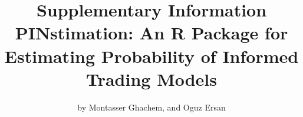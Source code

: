 

\title{Supplementary Information \protect\\ \Large PINstimation: An R Package for Estimating Probability of Informed Trading Models}
\author{by Montasser Ghachem, and Oguz Ersan}
\maketitle

\listoftables
\listoffigures




\setcounter{table}{0}
\renewcommand{\thetable}{S\arabic{table}}

\setcounter{figure}{0}
\renewcommand{\thefigure}{S\arabic{figure}}

